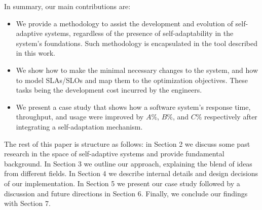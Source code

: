 In summary, our main contributions are:

\begin{itemize}
  \item We provide a methodology to assist the development and evolution of self-adaptive systems, regardless of the presence of self-adaptability in the system's foundations. Such methodology is encapsulated in the tool described in this work.
  \item We show how to make the minimal necessary changes to the system, and how to model SLAs/SLOs and map them to the optimization objectives. These tasks being the development cost incurred by the engineers.
  \item We present a case study that shows how a software system's response time, throughput, and usage were improved by $A\%$, $B\%$, and $C\%$ respectively after integrating a self-adaptation mechanism.
\end{itemize}

The rest of this paper is structure as follows: in Section 2 we discuss some past research in the space of self-adaptive systems and provide fundamental background. In Section 3 we outline our approach, explaining the blend of ideas from different fields. In Section 4 we describe internal details and design decisions of our implementation. In Section 5 we present our case study followed by a discussion and future directions in Section 6. Finally, we conclude our findings with Section 7.

%



